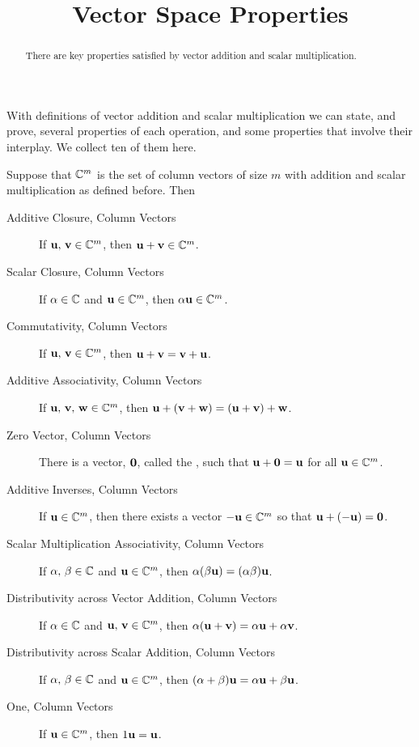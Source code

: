 \documentclass{ximera}
\title{Vector Space Properties}
\begin{document}
\begin{abstract}
  There are key properties satisfied by vector addition and scalar multiplication.
\end{abstract}
\maketitle

With definitions of vector addition and scalar multiplication we can
state, and prove, several properties of each operation, and some
properties that involve their interplay.  We collect ten of them here.

\begin{theorem}\label{theorem:VSPCV}
  Suppose that $\mathbb{C}^{m}$ is the set of column vectors of size $m$
  with addition and scalar multiplication as defined before.  Then
  \begin{description}
  \item[Additive Closure, Column Vectors]
    If $\mathbf{u},\,\mathbf{v}\in\mathbb{C}^{m}$, then $\mathbf{u}+\mathbf{v}\in\mathbb{C}^{m}$.
  \item[Scalar Closure, Column Vectors]
    If $\alpha\in\mathbb{C}$ and $\mathbf{u}\in\mathbb{C}^{m}$, then $\alpha\mathbf{u}\in\mathbb{C}^{m}$.
  \item[Commutativity, Column Vectors]
    If $\mathbf{u},\,\mathbf{v}\in\mathbb{C}^{m}$, then $\mathbf{u}+\mathbf{v}=\mathbf{v}+\mathbf{u}$.
  \item[Additive Associativity, Column Vectors]
    If $\mathbf{u},\,\mathbf{v},\,\mathbf{w}\in\mathbb{C}^{m}$, then $\mathbf{u}+\left(\mathbf{v}+\mathbf{w}\right)=\left(\mathbf{u}+\mathbf{v}\right)+\mathbf{w}$.
  \item[Zero Vector, Column Vectors]
    There is a vector, $\mathbf{0}$, called the , such that  $\mathbf{u}+\mathbf{0}=\mathbf{u}$  for all $\mathbf{u}\in\mathbb{C}^{m}$.
  \item[Additive Inverses, Column Vectors]
    If  $\mathbf{u}\in\mathbb{C}^{m}$, then there exists a vector $\mathbf{-u}\in\mathbb{C}^{m}$ so that $\mathbf{u}+ (\mathbf{-u})=\mathbf{0}$.
  \item[Scalar Multiplication Associativity, Column Vectors]
    If $\alpha,\,\beta\in\mathbb{C}$ and $\mathbf{u}\in\mathbb{C}^{m}$, then $\alpha(\beta\mathbf{u})=(\alpha\beta)\mathbf{u}$.
  \item[Distributivity across Vector Addition, Column Vectors]
    If $\alpha\in\mathbb{C}$ and $\mathbf{u},\,\mathbf{v}\in\mathbb{C}^{m}$, then $\alpha(\mathbf{u}+\mathbf{v})=\alpha\mathbf{u}+\alpha\mathbf{v}$.
  \item[Distributivity across Scalar Addition, Column Vectors]
    If $\alpha,\,\beta\in\mathbb{C}$ and $\mathbf{u}\in\mathbb{C}^{m}$, then
    $(\alpha+\beta)\mathbf{u}=\alpha\mathbf{u}+\beta\mathbf{u}$.
  \item[One, Column Vectors]
    If $\mathbf{u}\in\mathbb{C}^{m}$, then $1\mathbf{u}=\mathbf{u}$.
  \end{description}


\end{theorem}
\end{document}
